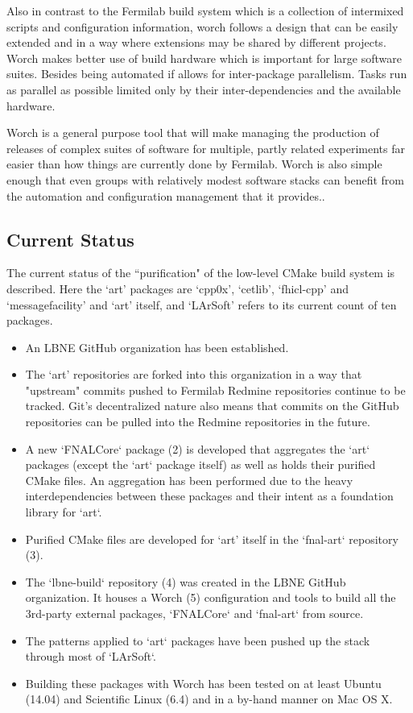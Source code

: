 \documentclass[usletter]{article}
\begin{document}
Also in contrast to the Fermilab build system which is a  collection
of intermixed scripts and configuration information, worch follows a
design that can be easily extended and in a way where extensions may
be shared by different projects.  Worch makes better use of build
hardware which is important for large software suites.  Besides being
automated if allows for inter-package parallelism.  Tasks run as
parallel as possible limited only by their inter-dependencies and the
available hardware.


Worch is a general purpose tool that will make managing the production
of releases of complex suites of software for multiple, partly related
experiments far easier than how things are currently done by Fermilab.
Worch is also simple enough that even groups with relatively modest
software stacks can benefit from the automation and configuration
management that it provides..


\subsection{Current Status}
The current status of the ``purification" of the low-level CMake build
system is described. Here the `art' packages are `cpp0x', `cetlib',
`fhicl-cpp' and `messagefacility' and `art' itself, and `LArSoft' refers to
its current count of ten packages.
\begin{itemize}

	\item An LBNE GitHub organization has been established.
	\item The `art' repositories are forked into this organization in a way
    that "upstream" commits pushed to Fermilab Redmine repositories
    continue to be tracked. Git's decentralized nature also means that
    commits on the GitHub repositories can be pulled into the Redmine
    repositories in the future.
	\item A new `FNALCore` package (2)  is developed that aggregates the `art`
    packages (except the `art` package itself) as well as holds their
    purified CMake files. An aggregation has been performed due to the
    heavy interdependencies between these packages and their intent as
    a foundation library for `art`.
	\item Purified CMake files are developed for `art' itself in the
    `fnal-art` repository (3).
	\item The `lbne-build` repository (4)  was created in the LBNE GitHub
    organization. It houses a Worch (5) configuration and tools to build
    all the 3rd-party external packages, `FNALCore` and `fnal-art` from
    source.
	\item The patterns applied to `art` packages have been pushed up the stack through most of `LArSoft`.
	\item Building these packages with Worch has been tested on at least
    Ubuntu (14.04) and Scientific Linux (6.4) and in a by-hand manner on
    Mac OS X.
\end{itemize}
\end{document}
